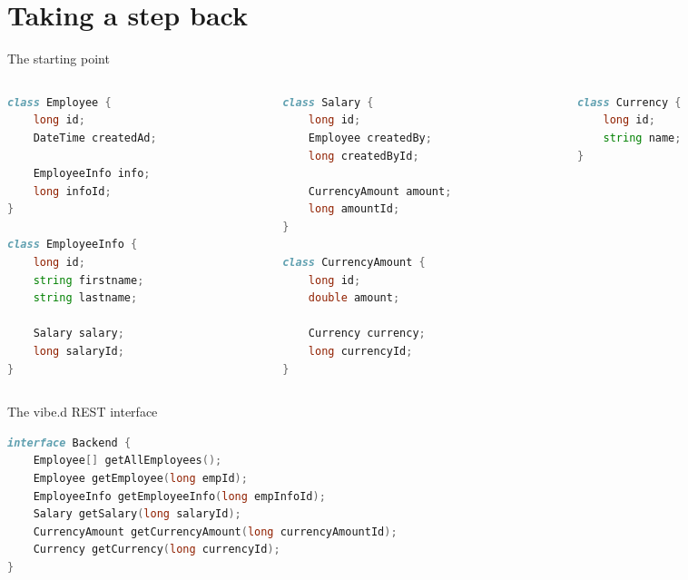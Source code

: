 \documentclass[aspectratio=169,notes]{beamer}
\begin{document}
	\section{Taking a step back}
	\begin{frame}[fragile]{The starting point}
\begin{columns}
\begin{column}{0.35\textwidth}
\begin{lstlisting}[language=D,basicstyle=\scriptsize\ttfamily]
class Employee {
	long id;
	DateTime createdAd;

	EmployeeInfo info;
	long infoId;
}	

class EmployeeInfo {
	long id;
	string firstname;
	string lastname;

	Salary salary;
	long salaryId;
}	
\end{lstlisting}
\end{column}
\begin{column}{0.35\textwidth}
\begin{lstlisting}[language=D,basicstyle=\scriptsize\ttfamily,firstnumber=17]
class Salary {
	long id;
	Employee createdBy;
	long createdById;

	CurrencyAmount amount;
	long amountId;
}

class CurrencyAmount {
	long id;
	double amount;

	Currency currency;
	long currencyId;
}
\end{lstlisting}
\end{column}
\begin{column}{0.25\textwidth}
\begin{lstlisting}[language=D,basicstyle=\scriptsize\ttfamily,firstnumber=32]
class Currency {
	long id;
	string name;
}
\end{lstlisting}
\end{column}
\end{columns}
	\end{frame}

	\begin{frame}[fragile]{The vibe.d REST interface}
\begin{lstlisting}[language=D]
interface Backend {
	Employee[] getAllEmployees();
	Employee getEmployee(long empId);
	EmployeeInfo getEmployeeInfo(long empInfoId);
	Salary getSalary(long salaryId);
	CurrencyAmount getCurrencyAmount(long currencyAmountId);
	Currency getCurrency(long currencyId);
}
\end{lstlisting}
	\end{frame}
\end{document}
